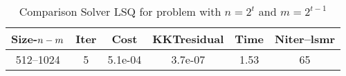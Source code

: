 \documentclass[letterpaper,12pt,oneside,final]{book}
\begin{document}
\begin{table}
\caption{ Comparison Solver LSQ  for  problem with $n=2^{t}$ and $m=2^{t-1}$  } 
\begin{center}
\begin{tabular}{|*{6}{c}|} \hline
Size-$n\--m$ & \multicolumn{1}{c}{Iter} & \multicolumn{1}{c}{Cost}& \multicolumn{1}{c}{KKTresidual} & \multicolumn{1}{c}{Time} & \multicolumn{1}{c|}{Niter--lsmr} \\ 
\hline

512--1024      &5    &5.1e-04        &3.7e-07        &1.53           &65   \\ 

\hline
\end{tabular}
\end{center}
\end{table}
\end{document}
